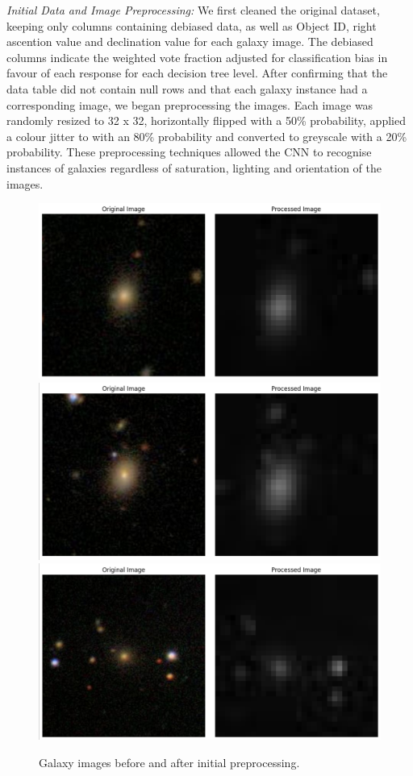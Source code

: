 \documentclass[10pt,twocolumn,letterpaper]{article}
\begin{document}
\textit{Initial Data and Image Preprocessing:} We first cleaned the original dataset, keeping only columns containing debiased data, as well as Object ID, right ascention value and declination value for each galaxy image.
The debiased columns indicate the weighted vote fraction adjusted for classification bias in favour of each response for each decision tree level.
After confirming that the data table did not contain null rows and that each galaxy instance had a corresponding image, we began preprocessing the images.
Each image was randomly resized to 32 x 32, horizontally flipped with a 50\% probability, applied a colour jitter to with an 80\% probability and converted to greyscale with a 20\% probability.
These preprocessing techniques allowed the CNN to recognise instances of galaxies regardless of saturation, lighting and orientation of the images.
\begin{figure}[htbp]
    \includegraphics[width=\linewidth]{galaxy_preprocess1.png}
    \includegraphics[width=\linewidth]{galaxy_preprocess2.png}
    \includegraphics[width=\linewidth]{galaxy_preprocess3.png}
    \caption{Galaxy images before and after initial preprocessing.}
    \label{fig:galaxypreprocess}
  \end{figure}
\end{document}
